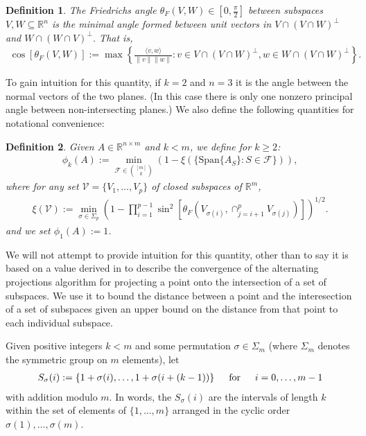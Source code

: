 \documentclass[journal, onecolumn]{IEEEtran}
\newtheorem{definition}{Definition}
\begin{document}
\begin{definition}\label{FriedrichsDefinition}
The \emph{Friedrichs angle} $\theta_F(V,W) \in [0,\frac{\pi}{2}]$ between subspaces $V,W \subseteq \mathbb{R}^n$ is the minimal angle formed between unit vectors in $V \cap (V \cap W)^\perp$ and $W \cap (W \cap V)^\perp$. That is,
\begin{align}
\cos\left[\theta_F(V,W)\right] := \max\left\{ \frac{ \langle v, w \rangle }{\|v\|\|w\|}: v \in V \cap (V \cap W)^\perp, w \in W \cap (V \cap W)^\perp \right\}.
\end{align}
\end{definition}

To gain intuition for this quantity, if $k=2$ and $n=3$ it is the angle between the normal vectors of the two planes. (In this case there is only one nonzero principal angle between non-intersecting planes.) We also define the following quantities for notational convenience:

\begin{definition}\label{SpecialSupportSet}
Given $A \in \mathbb{R}^{n \times m}$ and $k < m$, we define for $k \geq 2$:
\begin{align}\label{rho}
\phi_k(A) := \min_{ \mathcal{F} \in {[m] \choose k} } \left(1 - \xi( \{\text{Span}\{A_S\} : S \in \mathcal{F} \} ) \right),
\end{align}
%
where for any set $\mathcal{V} = \{V_1, \ldots, V_p\}$ of closed subspaces of $\mathbb{R}^m$, 
\begin{align}
\xi(\mathcal{V}) := \min_{\sigma \in \Sigma_p} \left(1 - \prod_{i=1}^{p-1} \sin^2\left[ \theta_F(V_{\sigma(i)}, \cap_{j=i+1}^p V_{\sigma(j)}) \right]  \right)^{1/2}.
\end{align}
%
and we set $\phi_1(A) := 1$.
\end{definition}

We will not attempt to provide intuition for this quantity, other than to say it is based on a value derived in \cite{Deutsch} to describe the convergence of the alternating projections algorithm for projecting a point onto the intersection of a set of subspaces. We use it to bound the distance between a point and the interesection of a set of subspaces given an upper bound on the distance from that point to each individual subspace. 

Given positive integers $k < m$ and some permutation $\sigma \in \Sigma_m$ (where $\Sigma_m$ denotes the symmetric group on $m$ elements), let
\begin{align}
S_\sigma(i) := \{1+\sigma(i), \ldots, 1+\sigma(i + (k-1)) \} \indent \text{for} \indent i = 0, \ldots, m-1
\end{align}
%
with addition modulo $m$. In words, the $S_\sigma(i)$ are the intervals of length $k$ within the set of elements of $\{1, \ldots, m\}$ arranged in the cyclic order $\sigma(1), \ldots, \sigma(m)$.
\end{document}
